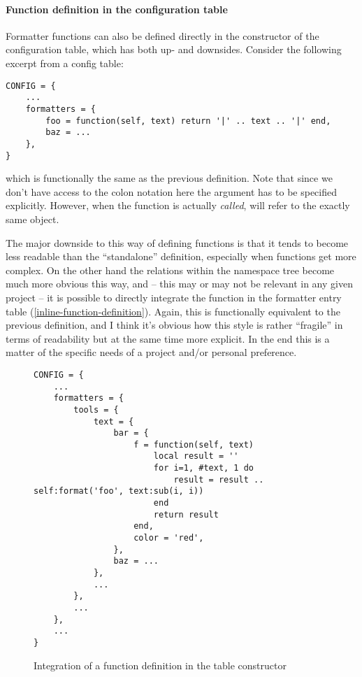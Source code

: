 \documentclass{scrartcl}
\begin{document}
\paragraph{Function definition in the configuration table}

Formatter functions can also be defined directly in the constructor of the
configuration table, which has both up- and downsides.  Consider the following
excerpt from a config table:

\begin{verbatim}
CONFIG = {
    ...
    formatters = {
        foo = function(self, text) return '|' .. text .. '|' end,
        baz = ...
    },
}
\end{verbatim}

\noindent which is functionally the same as the previous definition.  Note that
since we don't have access to the colon notation here the  argument
has to be specified explicitly.  However, when the function is actually
\emph{called},  will refer to the exactly same object.

The major downside to this way of defining functions is that it tends to become
less readable than the “standalone” definition, especially when functions get
more complex.  On the other hand the relations within the namespace tree become
much more obvious this way, and -- this may or may not be relevant in any given
project -- it is possible to directly integrate the function in the formatter
entry table (\vref{inline-function-definition}).
Again, this is functionally equivalent to the previous definition, and
I think it's obvious how this style is rather “fragile” in terms of readability
but at the same time more explicit.  In the end this is a matter of the specific
needs of a project and/or personal preference.

\begin{figure}
\begin{verbatim}
CONFIG = {
    ...
    formatters = {
        tools = {
            text = {
                bar = {
                    f = function(self, text)
                        local result = ''
                        for i=1, #text, 1 do
                            result = result .. self:format('foo', text:sub(i, i))
                        end
                        return result
                    end,
                    color = 'red',
                },
                baz = ...
            },
            ...
        },
        ...
    },
    ...
}
\end{verbatim}
\caption{Integration of a function definition in the table constructor}
\label{inline-function-definition}
\end{figure}
\end{document}

